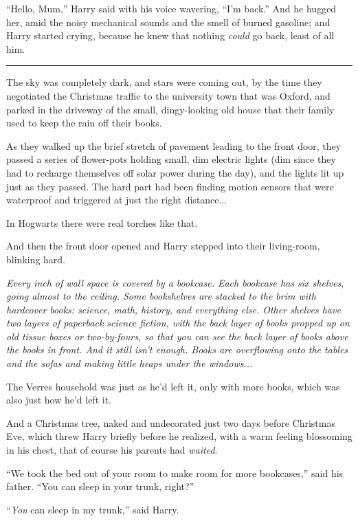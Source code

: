 ``Hello, Mum,'' Harry said with his voice wavering, ``I'm back.'' And he
hugged her, amid the noisy mechanical sounds and the smell of burned
gasoline; and Harry started crying, because he knew that nothing
\emph{could} go back, least of all him.

\begin{center}\rule{3in}{0.4pt}\end{center}

The sky was completely dark, and stars were coming out, by the time they
negotiated the Christmas traffic to the university town that was Oxford,
and parked in the driveway of the small, dingy-looking old house that
their family used to keep the rain off their books.

As they walked up the brief stretch of pavement leading to the front
door, they passed a series of flower-pots holding small, dim electric
lights (dim since they had to recharge themselves off solar power during
the day), and the lights lit up just as they passed. The hard part had
been finding motion sensors that were waterproof and triggered at just
the right distance...

In Hogwarts there were real torches like that.

And then the front door opened and Harry stepped into their living-room,
blinking hard.

\emph{Every inch of wall space is covered by a bookcase. Each bookcase
has six shelves, going almost to the ceiling. Some bookshelves are
stacked to the brim with hardcover books: science, math, history, and
everything else. Other shelves have two layers of paperback science
fiction, with the back layer of books propped up on old tissue boxes or
two-by-fours, so that you can see the back layer of books above the
books in front. And it still isn't enough. Books are overflowing onto
the tables and the sofas and making little heaps under the
windows...}

The Verres household was just as he'd left it, only with more books,
which was also just how he'd left it.

And a Christmas tree, naked and undecorated just two days before
Christmas Eve, which threw Harry briefly before he realized, with a warm
feeling blossoming in his chest, that of course his parents had
\emph{waited}.

``We took the bed out of your room to make room for more bookcases,''
said his father. ``You can sleep in your trunk, right?''

``\emph{You} can sleep in my trunk,'' said Harry.


